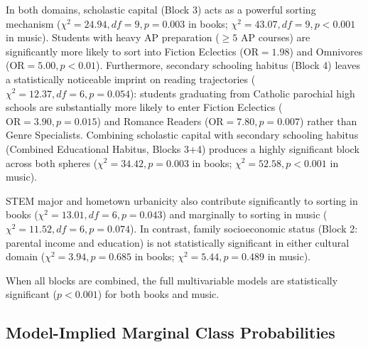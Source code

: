 \documentclass[12pt]{article}
\begin{document}
In both domains, scholastic capital (Block 3) acts as a powerful sorting mechanism ($\chi^2 = 24.94, df = 9, p = 0.003$ in books; $\chi^2 = 43.07, df = 9, p < 0.001$ in music). Students with heavy AP preparation ($\ge 5$ AP courses) are significantly more likely to sort into Fiction Eclectics ($\text{OR} = 1.98$) and Omnivores ($\text{OR} = 5.00, p < 0.01$). Furthermore, secondary schooling habitus (Block 4) leaves a statistically noticeable imprint on reading trajectories ($\chi^2 = 12.37, df = 6, p = 0.054$): students graduating from Catholic parochial high schools are substantially more likely to enter Fiction Eclectics ($\text{OR} = 3.90, p = 0.015$) and Romance Readers ($\text{OR} = 7.80, p = 0.007$) rather than Genre Specialists. Combining scholastic capital with secondary schooling habitus (Combined Educational Habitus, Blocks 3+4) produces a highly significant block across both spheres ($\chi^2 = 34.42, p = 0.003$ in books; $\chi^2 = 52.58, p < 0.001$ in music). 

STEM major and hometown urbanicity also contribute significantly to sorting in books ($\chi^2 = 13.01, df = 6, p = 0.043$) and marginally to sorting in music ($\chi^2 = 11.52, df = 6, p = 0.074$). In contrast, family socioeconomic status (Block 2: parental income and education) is not statistically significant in either cultural domain ($\chi^2 = 3.94, p = 0.685$ in books; $\chi^2 = 5.44, p = 0.489$ in music). 

When all blocks are combined, the full multivariable models are statistically significant ($p < 0.001$) for both books and music.

\subsection{Model-Implied Marginal Class Probabilities}
\end{document}
